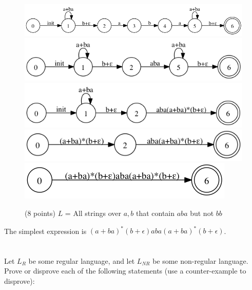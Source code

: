 \documentclass[paper=a4, fontsize=11pt]{scrartcl} %
\begin{document}
\begin{figure}[hp]
  \centering
  \includegraphics[width=.4\textwidth]{1-3.gv.png}
  \includegraphics[width=.4\textwidth]{1-3.gv.2.png}
  \includegraphics[width=.4\textwidth]{1-3.gv.3.png}
  \includegraphics[width=.4\textwidth]{1-3.gv.4.png}
  \includegraphics[width=.4\textwidth]{1-3.gv.5.png}
  \caption{(8 points) $L$ = All strings over ${a,b}$ that contain $aba$ but not $bb$}
\end{figure}
The simplest expression is $(a+ba)^*(b+\epsilon)aba(a+ba)^*(b+\epsilon)$.


\section{}

\begin{fancyquotes}
  Let $L_R$ be some regular language, and let $L_{NR}$ be some
  non-regular language. Prove or disprove each of the following
  statements (use a counter-example to disprove):
\end{fancyquotes}
\end{document}

